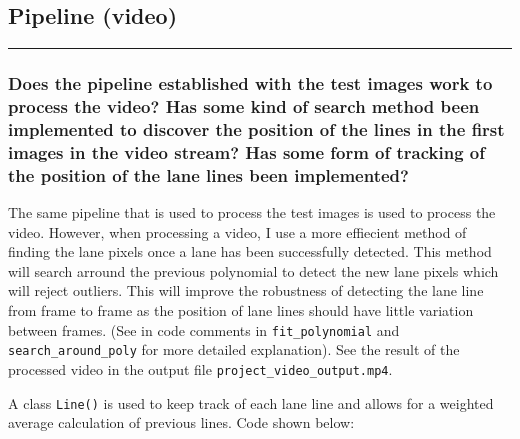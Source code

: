 \documentclass[11pt]{article}
\begin{document}
    \hypertarget{pipeline-video}{%
\subsection{Pipeline (video)}\label{pipeline-video}}

\begin{center}\rule{0.5\linewidth}{\linethickness}\end{center}

\hypertarget{does-the-pipeline-established-with-the-test-images-work-to-process-the-video-has-some-kind-of-search-method-been-implemented-to-discover-the-position-of-the-lines-in-the-first-images-in-the-video-stream-has-some-form-of-tracking-of-the-position-of-the-lane-lines-been-implemented}{%
\subsubsection{Does the pipeline established with the test images work
to process the video? Has some kind of search method been implemented to
discover the position of the lines in the first images in the video
stream? Has some form of tracking of the position of the lane lines been
implemented?}\label{does-the-pipeline-established-with-the-test-images-work-to-process-the-video-has-some-kind-of-search-method-been-implemented-to-discover-the-position-of-the-lines-in-the-first-images-in-the-video-stream-has-some-form-of-tracking-of-the-position-of-the-lane-lines-been-implemented}}

The same pipeline that is used to process the test images is used to
process the video. However, when processing a video, I use a more
effiecient method of finding the lane pixels once a lane has been
successfully detected. This method will search arround the previous
polynomial to detect the new lane pixels which will reject outliers.
This will improve the robustness of detecting the lane line from frame
to frame as the position of lane lines should have little variation
between frames. (See in code comments in \texttt{fit\_polynomial} and
\texttt{search\_around\_poly} for more detailed explanation). See the
result of the processed video in the output file
\texttt{project\_video\_output.mp4}.

A class \texttt{Line()} is used to keep track of each lane line and
allows for a weighted average calculation of previous lines. Code shown
below:
\end{document}
